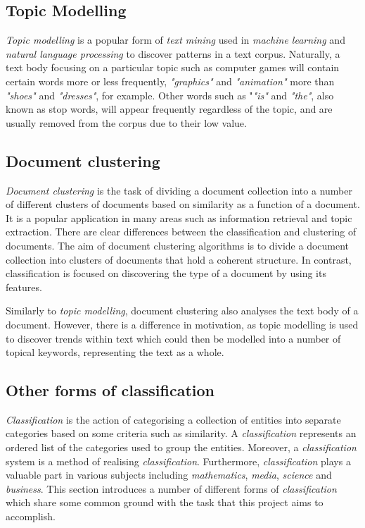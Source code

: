 \subsection{Topic Modelling}

\textit{Topic modelling} is a popular form of \textit{text mining} used in \textit{machine learning} and \textit{natural language processing} to discover patterns in a text corpus. Naturally, a text body focusing on a particular topic such as computer games will contain certain words more or less frequently, \textit{"graphics"} and \textit{"animation"} more than \textit{"shoes"} and \textit{"dresses"}, for example. Other words such as "\textit{"is"} and \textit{"the"}, also known as stop words, will appear frequently regardless of the topic, and are usually removed from the corpus due to their low value.

\subsection{Document clustering}

\textit{Document clustering} is the task of dividing a document collection into a number of different clusters of documents based on similarity as a function of a document. It is a popular application in many areas such as information retrieval and topic extraction. There are clear differences between the classification and clustering of documents. The aim of document clustering algorithms is to divide a document collection into clusters of documents that hold a coherent structure. In contrast, classification is focused on discovering the type of a document by using its features.

Similarly to \textit{topic modelling}, document clustering also analyses the text body of a document. However, there is a difference in motivation, as topic modelling is used to discover trends within text which could then be modelled into a number of topical keywords, representing the text as a whole.

\subsection{Other forms of classification}

\textit{Classification} is the action of categorising a collection of entities into separate categories based on some criteria such as similarity. A \textit{classification} represents an ordered list of the categories used to group the entities. Moreover, a \textit{classification} system is a method of realising \textit{classification}. Furthermore, \textit{classification} plays a valuable part in various subjects including \textit{mathematics}, \textit{media}, \textit{science} and \textit{business}. This section introduces a number of different forms of \textit{classification} which share some common ground with the task that this project aims to accomplish.

